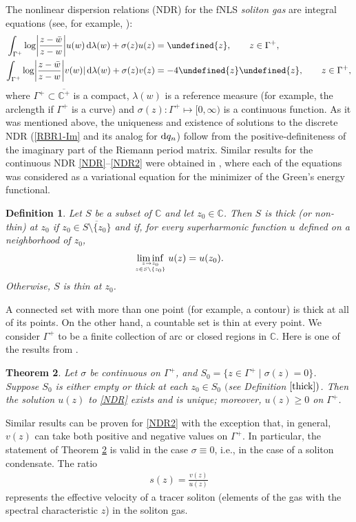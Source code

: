 \documentclass[pdftex]{sigma}
\numberwithin{equation}{section}
\newtheorem{Theorem}{Theorem}[section]
\newtheorem{Definition}[Theorem]{Definition}
\let\Re\undefined
\let\Im\undefined
\DeclareMathOperator{\Re}{Re}
\DeclareMathOperator{\Im}{Im}
\def\ra{\rightarrow}
\newcommand{\G}{\Gamma}
\def\C{{\mathbb C}}
\def\l{\lambda}
\def\s{ {\sigma}}
\def\l{\lambda}
\def\s{\sigma}
\def\G{\Gamma}
\begin{document}
The nonlinear dispersion relations (NDR) for the fNLS \textit{soliton gas} are
integral equations (see, for example, \cite{ET2020,TW}):
\begin{align}\label{NDR}
\int_{\G^+}\log\biggl|\frac{z-\bar w}{z-w}\biggr|u(w)\,{\rm d}\l(w)+\sigma(z)u(z)&=\Im{z},\qquad z\in \G^+,\\
\int_{\G^+}\log\biggl|\frac{z-\bar w}{z-w}\biggr|v(w)|\,{\rm d}\l(w)+\sigma(z)v(z)&=-4\Re{z}\Im{z},\qquad z\in \G^+,
\label{NDR2}
\end{align}
where $\G^+\subset \overline{\C^+}$ is a compact, $\l(w)$ is a reference measure (for example, the arclength if $\G^+$ is a curve) and $\sigma(z)\colon \G^+\mapsto [0,\infty)$ is a continuous function.
As it was mentioned above, the uniqueness and existence of solutions to the discrete NDR (\eqref{RBR1-Im} and its analog for ${\rm d}q_n$) follow from the positive-definiteness of the imaginary part of the Riemann period matrix.
Similar results for the continuous NDR \eqref{NDR}--\eqref{NDR2} were obtained in \cite{KT2021},
where each of the equations
was considered as a variational equation for the minimizer of the Green's energy functional.

\begin{Definition} \label{thick}
Let $S$ be a subset of $\mathbb C$ and let $z_0 \in
\mathbb C$. Then $S$ is thick (or non-thin) at
$z_0$ if $z_0 \in \overline{S \setminus \{z_0\}}$
and if, for every superharmonic function
$u$ defined on a neighborhood of $z_0$,
\[ \liminf_{z \ra z_0 \atop z \in S \setminus \{ z_0\}} u(z) = u(z_0). \]
Otherwise, $S$ is thin at $z_0$.
\end{Definition}

A connected set with more than one point (for example, a contour) is thick at
all of its points. On the other hand, a countable set
is thin at every point. We consider $\G^+$ to be a finite collection of arc or closed regions in $\C$. Here is one of the results from \cite{KT2021}.

\begin{Theorem} \label{secondthm}
Let $\sigma$ be continuous on $\Gamma^+$, and
$S_0 = \bigl\{ z \in \Gamma^+ \mid \sigma(z) = 0 \bigr\}$.
Suppose $S_0$ is either empty or thick at each $z_0 \in S_0$
$($see Definition $\ref{thick})$. 	Then
the solution $u(z)$ to
\eqref{NDR} exists and is unique; moreover, $u(z)\geq 0$ on $\G^+$.
\end{Theorem}
Similar results can be proven for
\eqref{NDR2} with the exception
that, in general, $v(z)$ can take both positive and negative values on $\G^+$.
In particular, the statement of Theorem \ref{secondthm} is valid in the case $\s\equiv 0$, i.e., in the case of a soliton condensate. The ratio
\begin{gather}\label{v-eff}
s(z)=\frac{v(z)}{u(z)}
\end{gather}
represents the effective velocity of a tracer soliton (elements of the gas with the spectral characteristic $z$) in the soliton gas.
\end{document}
